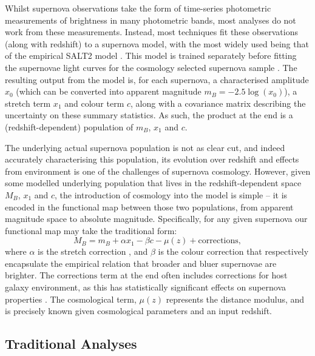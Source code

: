 \documentclass[a4paper,fleqn,usenatbib]{mnras}
\begin{document}
Whilst supernova observations take the form of time-series photometric measurements of brightness in many photometric bands, most analyses do not work from these measurements. Instead, most techniques fit these observations (along with redshift) to a supernova model, with the most widely used being that of the empirical SALT2 model \citep{Guy2007, Guy2010}. This model is trained separately before fitting the supernovae light curves for the cosmology selected supernova sample \citep{Guy2010, Mosher2014}. The resulting output from the model is, for each supernova, a characterised amplitude $x_0$ (which can be converted into apparent magnitude $m_B = -2.5\log(x_0)$), a stretch term $x_1$ and colour term $c$, along with a covariance matrix describing the uncertainty on these summary statistics. As such, the product at the end is a (redshift-dependent) population of $m_B$, $x_1$ and $c$.

The underlying actual supernova population is not as clear cut, and indeed accurately characterising this population, its evolution over redshift and effects from environment is one of the challenges of supernova cosmology. However, given some modelled underlying population that lives in the redshift-dependent space $M_B$, $x_1$ and $c$, the introduction of cosmology into the model is simple -- it is encoded in the functional map between those two populations, from apparent magnitude space to absolute magnitude. Specifically, for any given supernova our functional map may take the traditional form:
\begin{equation}
M_B = m_B + \alpha x_1 - \beta c - \mu(z) + \text{corrections}, \label{eq:standard}
\end{equation}
where $\alpha$ is the stretch correction \citep{Phillips1993}, and $\beta$ is the colour correction \citep{Tripp1998} that respectively encapsulate the empirical relation that broader and bluer supernovae are brighter. The $\text{corrections}$ term at the end often includes corrections for host galaxy environment, as this has statistically significant effects on supernova properties \citep{Kelly2010, Lampeitl2010, Sullivan2010, DAndrea2011, Gupta2011, Johansson2013, Rigault2013, Uddin2017}. The cosmological term, $\mu(z)$ represents the distance modulus, and is precisely known given cosmological parameters and an input redshift.

\subsection{Traditional Analyses}
\end{document}
